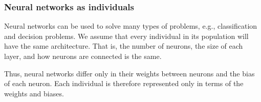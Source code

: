 \subsubsection{Neural networks as individuals}

Neural networks can be used to solve many types of problems, e.g., classification and decision problems. We assume that every individual in its population will have the same architecture. That is, the number of neurons, the size of each layer, and how neurons are connected is the same.


Thus, neural networks differ only in their weights between neurons and the bias of each neuron. Each individual is therefore represented only in terms of the weights and biases.



%
